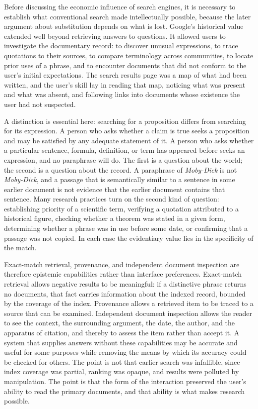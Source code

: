 \documentclass[11pt]{article}
\theoremstyle{remark}
\begin{document}
Before discussing the economic influence of search engines, it is necessary to establish what conventional search made intellectually possible, because the later argument about substitution depends on what is lost. Google's historical value extended well beyond retrieving answers to questions. It allowed users to investigate the documentary record: to discover unusual expressions, to trace quotations to their sources, to compare terminology across communities, to locate prior uses of a phrase, and to encounter documents that did not conform to the user's initial expectations. The search results page was a map of what had been written, and the user's skill lay in reading that map, noticing what was present and what was absent, and following links into documents whose existence the user had not suspected.

A distinction is essential here: searching for a proposition differs from searching for its expression. A person who asks whether a claim is true seeks a proposition and may be satisfied by any adequate statement of it. A person who asks whether a particular sentence, formula, definition, or term has appeared before seeks an expression, and no paraphrase will do. The first is a question about the world; the second is a question about the record. A paraphrase of \emph{Moby-Dick} is not \emph{Moby-Dick}, and a passage that is semantically similar to a sentence in some earlier document is not evidence that the earlier document contains that sentence. Many research practices turn on the second kind of question: establishing priority of a scientific term, verifying a quotation attributed to a historical figure, checking whether a theorem was stated in a given form, determining whether a phrase was in use before some date, or confirming that a passage was not copied. In each case the evidentiary value lies in the specificity of the match.

Exact-match retrieval, provenance, and independent document inspection are therefore epistemic capabilities rather than interface preferences. Exact-match retrieval allows negative results to be meaningful: if a distinctive phrase returns no documents, that fact carries information about the indexed record, bounded by the coverage of the index. Provenance allows a retrieved item to be traced to a source that can be examined. Independent document inspection allows the reader to see the context, the surrounding argument, the date, the author, and the apparatus of citation, and thereby to assess the item rather than accept it. A system that supplies answers without these capabilities may be accurate and useful for some purposes while removing the means by which its accuracy could be checked for others. The point is not that earlier search was infallible, since index coverage was partial, ranking was opaque, and results were polluted by manipulation. The point is that the form of the interaction preserved the user's ability to read the primary documents, and that ability is what makes research possible.
\end{document}

